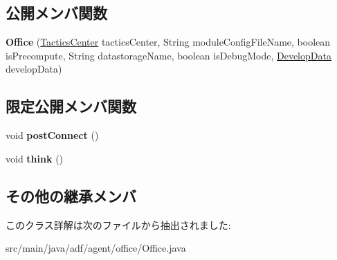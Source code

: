 \subsection*{公開メンバ関数}
\begin{DoxyCompactItemize}
\item 
\hypertarget{classadf_1_1agent_1_1office_1_1Office_a88463c6e25b26ebb843f9f1355fc397e}{}\label{classadf_1_1agent_1_1office_1_1Office_a88463c6e25b26ebb843f9f1355fc397e} 
{\bfseries Office} (\hyperlink{classadf_1_1component_1_1tactics_1_1center_1_1TacticsCenter}{Tactics\+Center} tactics\+Center, String module\+Config\+File\+Name, boolean is\+Precompute, String datastorage\+Name, boolean is\+Debug\+Mode, \hyperlink{classadf_1_1agent_1_1develop_1_1DevelopData}{Develop\+Data} develop\+Data)
\end{DoxyCompactItemize}
\subsection*{限定公開メンバ関数}
\begin{DoxyCompactItemize}
\item 
\hypertarget{classadf_1_1agent_1_1office_1_1Office_a501ed865cdd1e754940ba5dfc10484f3}{}\label{classadf_1_1agent_1_1office_1_1Office_a501ed865cdd1e754940ba5dfc10484f3} 
void {\bfseries post\+Connect} ()
\item 
\hypertarget{classadf_1_1agent_1_1office_1_1Office_aa101ca935dd000ff85b1f31733e9bd9e}{}\label{classadf_1_1agent_1_1office_1_1Office_aa101ca935dd000ff85b1f31733e9bd9e} 
void {\bfseries think} ()
\end{DoxyCompactItemize}
\subsection*{その他の継承メンバ}


このクラス詳解は次のファイルから抽出されました\+:\begin{DoxyCompactItemize}
\item 
src/main/java/adf/agent/office/Office.\+java\end{DoxyCompactItemize}
